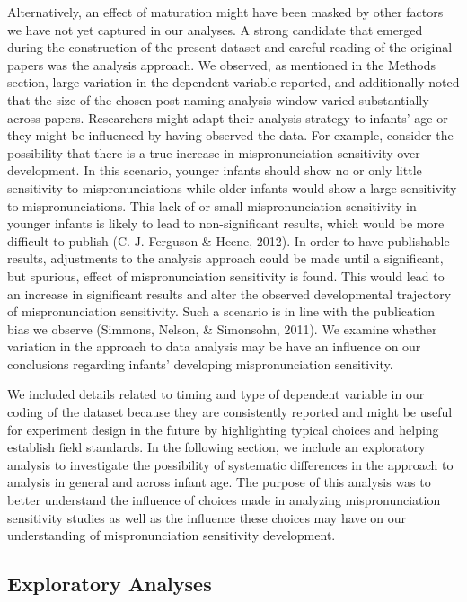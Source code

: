 \documentclass[man]{apa6}
\theoremstyle{definition}
\theoremstyle{definition}
\theoremstyle{definition}
\theoremstyle{remark}
\begin{document}
Alternatively, an effect of maturation might have been masked by other
factors we have not yet captured in our analyses. A strong candidate
that emerged during the construction of the present dataset and careful
reading of the original papers was the analysis approach. We observed,
as mentioned in the Methods section, large variation in the dependent
variable reported, and additionally noted that the size of the chosen
post-naming analysis window varied substantially across papers.
Researchers might adapt their analysis strategy to infants' age or they
might be influenced by having observed the data. For example, consider
the possibility that there is a true increase in mispronunciation
sensitivity over development. In this scenario, younger infants should
show no or only little sensitivity to mispronunciations while older
infants would show a large sensitivity to mispronunciations. This lack
of or small mispronunciation sensitivity in younger infants is likely to
lead to non-significant results, which would be more difficult to
publish (C. J. Ferguson \& Heene, 2012). In order to have publishable
results, adjustments to the analysis approach could be made until a
significant, but spurious, effect of mispronunciation sensitivity is
found. This would lead to an increase in significant results and alter
the observed developmental trajectory of mispronunciation sensitivity.
Such a scenario is in line with the publication bias we observe
(Simmons, Nelson, \& Simonsohn, 2011). We examine whether variation in
the approach to data analysis may be have an influence on our
conclusions regarding infants' developing mispronunciation sensitivity.

We included details related to timing and type of dependent variable in
our coding of the dataset because they are consistently reported and
might be useful for experiment design in the future by highlighting
typical choices and helping establish field standards. In the following
section, we include an exploratory analysis to investigate the
possibility of systematic differences in the approach to analysis in
general and across infant age. The purpose of this analysis was to
better understand the influence of choices made in analyzing
mispronunciation sensitivity studies as well as the influence these
choices may have on our understanding of mispronunciation sensitivity
development.

\subsection{Exploratory Analyses}\label{exploratory-analyses}
\end{document}
